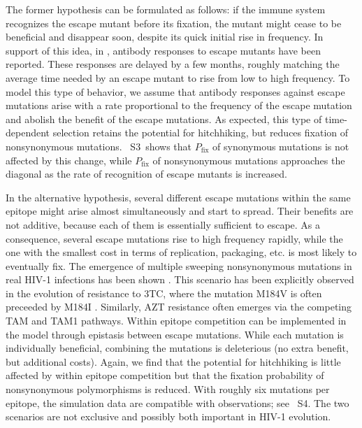 \documentclass[10pt]{article}
\newcommand{\pfix}{P_{\mathrm{fix}}}
\newcommand{\timedependence}{3}
\newcommand{\withinepi}{4}
\begin{document}
The former hypothesis can be formulated as follows: if the immune system
recognizes the escape mutant before its fixation, the mutant might cease to be
beneficial and disappear soon, despite its quick initial rise in frequency. In
support of this idea, in \cite{richman_rapid_2003,
bunnik_autologous_2008}, antibody responses to escape mutants have been reported.
These responses are delayed by a few
months, roughly matching the average time needed by an escape mutant to rise
from low to high frequency. To model this type of behavior, we assume that
antibody responses against escape mutations arise with a rate proportional to
the frequency of the escape mutation and abolish the benefit of the escape
mutations. As expected, this type of time-dependent selection retains the
potential for hitchhiking, but reduces fixation of nonsynonymous mutations.
\figurename~S\timedependence~shows that $\pfix$ of synonymous mutations is not
affected by this change, while $\pfix$ of nonsynonymous mutations approaches
the diagonal as the rate of recognition of escape mutants is increased. 

In the alternative hypothesis, several different escape mutations within the
same epitope might arise almost simultaneously and start to spread. Their
benefits are not additive, because each of them is essentially sufficient to
escape. As a consequence, several escape mutations rise to high frequency
rapidly, while the one with the smallest cost in terms of replication,
packaging, etc. is most likely to eventually fix. The emergence of multiple
sweeping nonsynonymous mutations in real HIV-1 infections has been shown
\cite{moore_limited_2009, bar_early_2012}. This scenario has been explicitly 
observed in  the evolution of resistance to 3TC, where the mutation 
M184V is often preceeded by M184I \cite{hedskog_dynamics_2010}. Similarly, AZT 
resistance often emerges via the competing TAM and TAM1 pathways.
Within epitope competition can be
implemented in the model through epistasis between escape mutations. While each
mutation is individually beneficial, combining the mutations is deleterious (no
extra benefit, but additional costs). Again, we find that the potential for
hitchhiking is little affected by within epitope competition but that the
fixation probability of nonsynonymous polymorphisms is reduced. With roughly six
mutations per epitope, the simulation data are compatible with observations; see
\figurename~S\withinepi. The two scenarios are not exclusive and possibly both
important in HIV-1 evolution.

\end{document}
